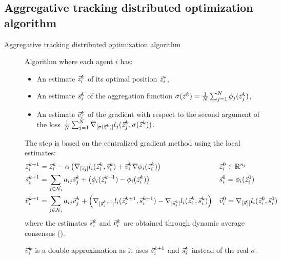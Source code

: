 \subsection{Aggregative tracking distributed optimization algorithm}

\begin{description}
    \item[Aggregative tracking distributed optimization algorithm] 
    Algorithm where each agent $i$ has:
    \begin{itemize}
        \item An estimate ${\vec{z}}_i^k$ of its optimal position ${\vec{z}}_i^*$,
        \item An estimate ${\vec{s}}_i^k$ of the aggregation function $\sigma({\vec{z}}^k) = \frac{1}{N} \sum_{j=1}^{N} \phi_j({\vec{z}}_j^k)$,
        \item An estimate ${\vec{v}}_i^k$ of the gradient with respect to the second argument of the loss $\frac{1}{N} \sum_{j=1}^{N} \nabla_{[\sigma({\vec{z}}^k)]} l_j({\vec{z}}_j^k, \sigma({\vec{z}}^k))$.
    \end{itemize}

    The step is based on the centralized gradient method using the local estimates:
    \[
        \begin{aligned}
            {\vec{z}}_i^{k+1} &= {\vec{z}}_i^k - \alpha \left( \nabla_{[{\vec{z}}_i]} l_i({\vec{z}}_i^k, {\vec{s}}_i^k) + {\vec{v}}_i^k \nabla \phi_i({\vec{z}}_i^k) \right) && {\vec{z}}_i^0 \in \mathbb{R}^{n_i} \\
            {\vec{s}}_i^{k+1} &= \sum_{j \in \mathcal{N}_i} a_{ij} {\vec{s}}_j^k + \left( \phi_i({\vec{z}}_i^{k+1}) - \phi_i({\vec{z}}_i^k) \right) && {\vec{s}}_i^0 = \phi_i({\vec{z}}_i^0) \\
            {\vec{v}}_i^{k+1} &= \sum_{j \in \mathcal{N}_i} a_{ij} {\vec{v}}_j^k + \left( \nabla_{[{\vec{s}}_i^{k+1}]} l_i({\vec{z}}_i^{k+1}, {\vec{s}}_i^{k+1}) - \nabla_{[{\vec{s}}_i^k]} l_i({\vec{z}}_i^k, {\vec{s}}_i^k) \right) && {\vec{v}}_i^0 = \nabla_{[{\vec{s}}_i^0]} l_i({\vec{z}}_i^0, {\vec{s}}_i^0) \\
        \end{aligned}
    \]
    where the estimates ${\vec{s}}_i^k$ and ${\vec{v}}_i^k$ are obtained through dynamic average consensus ().

    \begin{remark}
        ${\vec{v}}_i^k$ is a double approximation as it uses ${\vec{s}}_i^{k+1}$ and ${\vec{s}}_i^k$ instead of the real $\sigma$.
    \end{remark}


\end{description}
